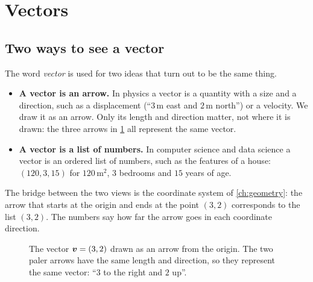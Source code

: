 \section{Vectors}\label{sec:vectors}

\subsection{Two ways to see a vector}

The word \emph{vector} is used for two ideas that turn out to be the same
thing.

\begin{itemize}
  \item \textbf{A vector is an arrow.} In physics a vector is a quantity with a
    size and a direction, such as a displacement (``$3$\,m east and $2$\,m
    north'') or a velocity. We draw it as an arrow. Only its length and
    direction matter, not where it is drawn: the three arrows in
    \cref{fig:vector-arrow} all represent the same vector.
  \item \textbf{A vector is a list of numbers.} In computer science and data
    science a vector is an ordered list of numbers, such as the features of a
    house: $(120, 3, 15)$ for $120$\,m$^2$, $3$ bedrooms and $15$ years of age.
\end{itemize}

The bridge between the two views is the coordinate system of
\cref{ch:geometry}: the arrow that starts at the origin and ends at the point
$(3, 2)$ corresponds to the list $(3, 2)$. The numbers say how far the arrow
goes in each coordinate direction.

\begin{figure}[htbp]
\centering
{}
\caption{The vector $\bm{v} = (3, 2)$ drawn as an arrow from the origin. The two
  paler arrows have the same length and direction, so they represent the same
  vector: ``$3$ to the right and $2$ up''.}
\label{fig:vector-arrow}
\end{figure}

